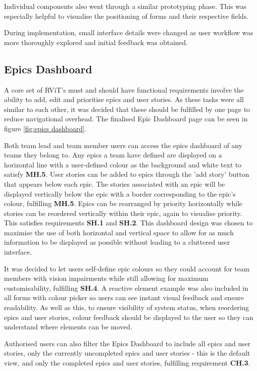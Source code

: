 \documentclass[l4proj.tex]{subfiles}
\begin{document}
Individual components also went through a similar prototyping phase. This was especially helpful to visualise the positioning of forms and their respective fields. 

During implementation, small interface details were changed as user workflow was more thoroughly explored and initial feedback was obtained.



\subsection{Epics Dashboard}
A core set of RViT's must and should have functional requirements involve the ability to add, edit and prioritise epics and user stories. As these tasks were all similar to each other, it was decided that these should be fulfilled by one page to reduce navigational overhead. The finalised Epic Dashboard page can be seen in figure \ref{fig:epics dashboard}.

Both team lead and team member users can access the epics dashboard of any teams they belong to. Any epics a team have defined are displayed on a horizontal line with a user-defined colour as the background and white text to satisfy \textbf{MH.5}.  User stories can be added to epics through the 'add story' button that appears below each epic. The stories associated with an epic will be displayed vertically below the epic with a border corresponding to the epic's colour, fulfilling \textbf{MH.5}. Epics can be rearranged by priority horizontally while stories can be reordered vertically within their epic, again to visualise priority. This satisfies requirements \textbf{SH.1} and \textbf{SH.2}. This dashboard design was chosen to maximise the use of both horizontal and vertical space to allow for as much information to be displayed as possible without leading to a cluttered user interface.

It was decided to let users self-define epic colours so they could account for team members with vision impairments while still allowing for maximum customisability, fulfilling \textbf{SH.4}. A reactive element example was also included in all forms with colour picker so users can see instant visual feedback and ensure readability. As well as this, to ensure visibility of system status, when reordering epics and user stories, colour feedback should be displayed to the user so they can understand where elements can be moved.

Authorised users can also filter the Epics Dashboard to include all epics and user stories, only the currently uncompleted epics and user stories - this is the default view, and only the completed epics and user stories, fulfilling requirement \textbf{CH.3}.
\end{document}

